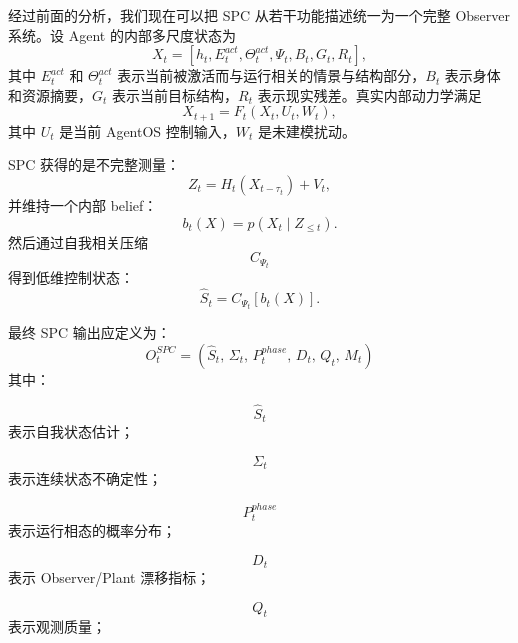 经过前面的分析，我们现在可以把 SPC 从若干功能描述统一为一个完整 Observer 系统。设 Agent 的内部多尺度状态为
\begin{equation}
X_t
=
\left[
h_t,
E_t^{act},
\Theta_t^{act},
\Psi_t,
B_t,
G_t,
R_t
\right],
\end{equation}
其中 $E_t^{act}$ 和 $\Theta_t^{act}$ 表示当前被激活而与运行相关的情景与结构部分，$B_t$ 表示身体和资源摘要，$G_t$ 表示当前目标结构，$R_t$ 表示现实残差。真实内部动力学满足
\begin{equation}
X_{t+1}
=
F_t(X_t,U_t,W_t),
\end{equation}
其中 $U_t$ 是当前 AgentOS 控制输入，$W_t$ 是未建模扰动。

SPC 获得的是不完整测量：
\begin{equation}
Z_t
=
H_t(X_{t-\tau_t})
+
V_t,
\end{equation}
并维持一个内部 belief：
\begin{equation}
b_t(X)
=
p
\left(
X_t
\mid
Z_{\leq t}
\right).
\end{equation}
然后通过自我相关压缩
\begin{equation}
C_{\Psi_t}
\end{equation}
得到低维控制状态：
\begin{equation}
\hat S_t
=
C_{\Psi_t}
\left[
b_t(X)
\right].
\end{equation}

最终 SPC 输出应定义为：
\begin{equation}
\boxed{
O_t^{SPC}
=
\left(
\hat S_t,\,
\Sigma_t,\,
P_t^{phase},\,
D_t,\,
Q_t,\,
M_t
\right)
}
\end{equation}
其中：

\begin{equation}
\hat S_t
\end{equation}
表示自我状态估计；

\begin{equation}
\Sigma_t
\end{equation}
表示连续状态不确定性；

\begin{equation}
P_t^{phase}
\end{equation}
表示运行相态的概率分布；

\begin{equation}
D_t
\end{equation}
表示 Observer/Plant 漂移指标；

\begin{equation}
Q_t
\end{equation}
表示观测质量；

